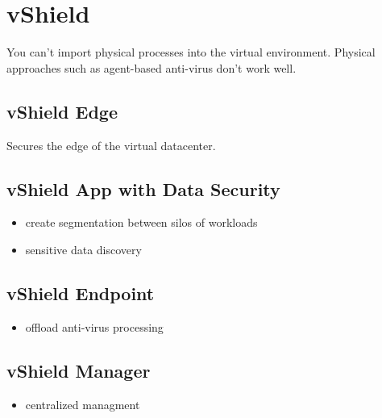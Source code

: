 \section{vShield}

You can't import physical processes into the virtual environment. Physical
approaches such as agent-based anti-virus don't work well.

\subsection{vShield Edge}

Secures the edge of the virtual datacenter.

\subsection{vShield App with Data Security}

\begin{itemize}

\item create segmentation between silos of workloads
\item sensitive data discovery

\end{itemize}

\subsection{vShield Endpoint}

\begin{itemize}

\item offload anti-virus processing

\end{itemize}

\subsection{vShield Manager}

\begin{itemize}

\item centralized managment

\end{itemize}
